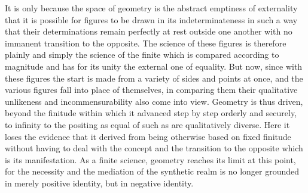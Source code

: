 It is only because the space of geometry is the abstract emptiness of
externality that it is possible for figures to be drawn in its indeterminateness
in such a way that their determinations remain perfectly at rest outside one
another with no immanent transition to the opposite. The science of these
figures is therefore plainly and simply the science of the finite which is
compared according to magnitude and has for its unity the external one of
equality. But now, since with these figures the start is made from a variety of
sides and points at once, and the various figures fall into place of themselves,
in comparing them their qualitative unlikeness and incommensurability also
come into view. Geometry is thus driven, beyond the finitude within which
it advanced step by step orderly and securely, to infinity
to the positing
as equal of such as are qualitatively diverse. Here it loses the evidence that
it derived from being otherwise based on fixed finitude without having
to deal with the concept and the transition to the opposite which is its
manifestation. As a finite science, geometry reaches its limit at this point,
for the necessity and the mediation of the synthetic realm is no longer
grounded in merely positive identity, but in negative identity.

